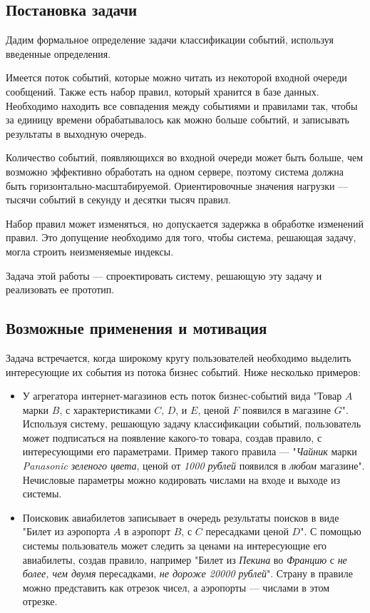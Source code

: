 \documentclass[14pt]{article}
\begin{document}
\subsection{Постановка задачи}
Дадим формальное определение задачи классификации событий, используя введенные определения.

Имеется поток событий, которые можно читать из некоторой входной очереди сообщений. Также есть набор правил, который хранится в базе данных. Необходимо находить все совпадения между событиями и правилами так, чтобы за единицу времени обрабатывалось как можно больше событий, и записывать результаты в выходную очередь.

Количество событий, появляющихся во входной очереди может быть больше, чем возможно эффективно обработать на одном сервере, поэтому система должна быть горизонтально-масштабируемой. Ориентировочные значения нагрузки --- тысячи событий в секунду и десятки тысяч правил.

Набор правил может изменяться, но допускается задержка в обработке изменений правил. Это допущение необходимо для того, чтобы система, решающая задачу, могла строить неизменяемые индексы.

Задача этой работы --- спроектировать систему, решающую эту задачу и реализовать ее прототип.

\subsection{Возможные применения и мотивация}
Задача встречается, когда широкому кругу пользователей необходимо выделить интересующие их события из потока бизнес событий. Ниже несколько примеров:
\begin{itemize}
    \item У агрегатора интернет-магазинов есть поток бизнес-событий вида "Товар $A$ марки $B$, с характеристиками $C$, $D$, и $E$, ценой $F$ появился в магазине $G$". Используя систему, решающую задачу классификации событий, пользователь может подписаться на появление какого-то товара, создав правило, с интересующими его параметрами. Пример такого правила --- "\emph{Чайник} марки \emph{Panasonic} \emph{зеленого цвета}, ценой от \emph{1000 рублей} появился в \emph{любом} магазине". Нечисловые параметры можно кодировать числами на входе и выходе из системы.
    \item Поисковик авиабилетов записывает в очередь результаты поисков в виде "Билет из аэропорта $A$ в аэропорт $B$, с $C$ пересадками ценой $D$". С помощью системы пользователь может следить за ценами на интересующие его авиабилеты, создав правило, например "Билет из \emph{Пекина} во \emph{Францию} с \emph{не более, чем двумя} пересадками, \emph{не дороже 20000 рублей}". Страну в правиле можно представить как отрезок чисел, а аэропорты --- числами в этом отрезке.
\end{itemize}
\end{document}
